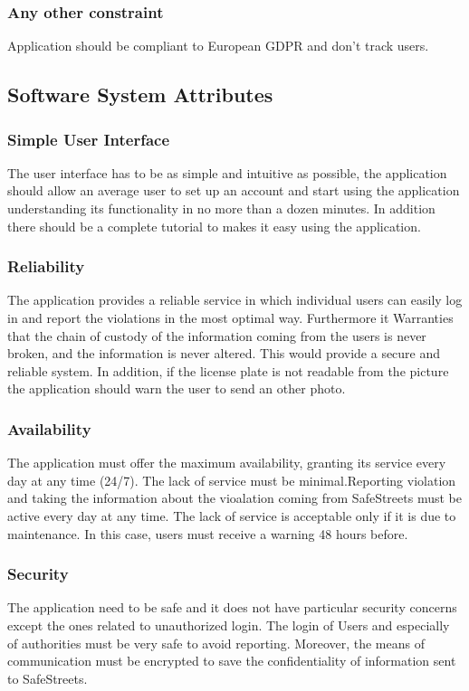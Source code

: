 \subsubsection{Any other constraint}
Application should be compliant to European GDPR and don't track users.

\subsection{Software System Attributes} %
\subsubsection{Simple User Interface}
The user interface has to be as simple and intuitive as possible, the application should allow an average user to set up an account and start using the application understanding its functionality in no more than a dozen minutes. In addition there should be a complete tutorial to makes it easy using the application. 

\subsubsection{Reliability}
The application provides a reliable service in which individual users can easily log in and report the violations in the most optimal way. Furthermore it Warranties that the chain of custody of the information coming from the users is never broken, and the information is never altered. This would provide a secure and reliable system. In addition, if the license plate	is not readable from the picture the application should warn the user to send an other photo.
\subsubsection{Availability}
The application must offer the maximum availability, granting its service every day at any time (24/7). The lack of service must be minimal.Reporting violation and taking the information about the vioalation coming from SafeStreets must be active every day at any time. The lack of service is acceptable only if it is due to maintenance. In this case, users must receive a warning 48 hours before.
\subsubsection{Security}
The application need to be safe and it does not have particular security concerns except the ones related to unauthorized login. The login of Users and especially of authorities must be very safe to avoid reporting. Moreover, the means of communication must be encrypted to save the confidentiality of information sent to SafeStreets.
